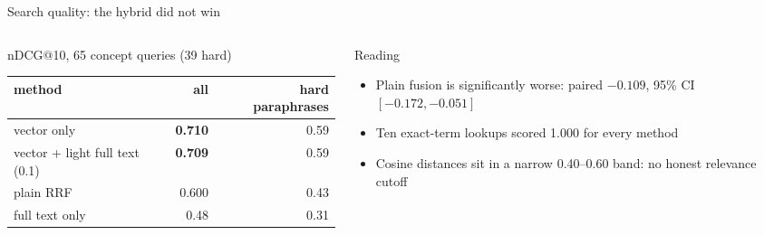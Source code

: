 \documentclass[aspectratio=169,10pt]{beamer}
\begin{document}
\begin{frame}[shrink=5]{Search quality: the hybrid did not win}
\begin{columns}[T]
\begin{column}{0.54\textwidth}
\begin{block}{nDCG@10, 65 concept queries (39 hard)}
\begin{tabular}{@{}lrr@{}}
\toprule
method & all & hard paraphrases\\
\midrule
vector only & \textbf{0.710} & 0.59\\
vector + light full text (0.1) & \textbf{0.709} & 0.59\\
plain RRF & 0.600 & 0.43\\
full text only & 0.48 & 0.31\\
\bottomrule
\end{tabular}
\end{block}
\end{column}
\begin{column}{0.44\textwidth}
\begin{block}{Reading}
\begin{itemize}
  \item Plain fusion is significantly worse: paired $-0.109$, 95\% CI $[-0.172,-0.051]$
  \item Ten exact-term lookups scored 1.000 for every method
  \item Cosine distances sit in a narrow 0.40--0.60 band: no honest relevance cutoff
\end{itemize}
\end{block}
\end{column}
\end{columns}
\end{frame}
\end{document}

